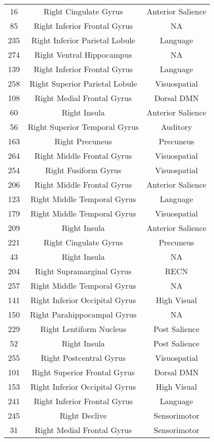 \documentclass[10pt,letterpaper]{article}\usepackage[]{graphicx}\usepackage[]{color}
\begin{document}
\begin{center}
\begin{longtable}[c]{ccc}
		16 & Right Cingulate Gyrus & Anterior Salience \\
		85 & Right Inferior Frontal Gyrus & NA \\
		235	& Right Inferior Parietal Lobule & Language \\
		274	& Right Ventral Hippocampus	& NA \\
		139	& Right Inferior Frontal Gyrus & Language \\
		258	& Right Superior Parietal Lobule & Visuospatial \\
		108	& Right Medial Frontal Gyrus & Dorsal DMN \\
		60 & Right Insula & Anterior Salience \\
		56 & Right Superior Temporal Gyrus & Auditory \\
		163	& Right Precuneus & Precuneus \\
		264	& Right Middle Frontal Gyrus & Visuospatial \\
		254	& Right Fusiform Gyrus & Visuospatial \\
		206	& Right Middle Frontal Gyrus & Anterior Salience \\
		123	& Right Middle Temporal Gyrus & Language \\
		179	& Right Middle Temporal Gyrus & Visuospatial \\
		209	& Right Insula & Anterior Salience \\
		221	& Right Cingulate Gyrus	& Precuneus \\
		43 & Right Insula & NA \\
		204	& Right Supramarginal Gyrus	& RECN \\
		257	& Right Middle Temporal Gyrus & NA \\
		141	& Right Inferior Occipital Gyrus & High Visual \\
		150	& Right Parahippocampal Gyrus & NA \\
		229	& Right Lentiform Nucleus & Post Salience \\
		52 & Right Insula & Post Salience \\
		255	& Right Postcentral Gyrus & Visuospatial \\
		101	& Right Superior Frontal Gyrus & Dorsal DMN \\
		153	& Right Inferior Occipital Gyrus & High Visual \\
		241	& Right Inferior Frontal Gyrus & Language \\
		245	& Right Declive	& Sensorimotor \\
		31 & Right Medial Frontal Gyrus	& Sensorimotor \\

\end{longtable}
\end{center}
\end{document}
